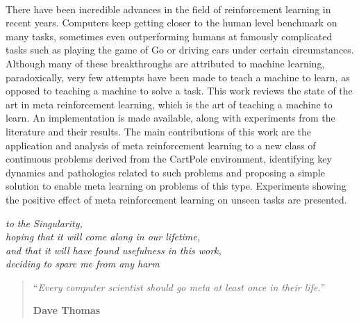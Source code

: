 \documentclass[11pt,a4paper,oneside]{book}
\begin{document}
\begin{vcenterpage}
\\
\vspace*{1cm}

\parbox{0.8\textwidth}{
	There have been incredible advances in the field of reinforcement
	learning in recent years. Computers keep getting closer to the
	human level benchmark on many tasks, sometimes even outperforming 
	humans at famously complicated tasks such as playing the game of Go 
	or driving cars under certain circumstances. Although many of
	these breakthroughs are attributed to machine learning, paradoxically,
	very few attempts have been made to teach a machine to learn, as opposed
	to teaching a machine to solve a task. This work reviews the
	state of the art in meta reinforcement learning, which is the art
	of teaching a machine to learn. An implementation is made available,
	along with experiments from the literature and their results. The
	main contributions of this work are the application and analysis of 
	meta reinforcement learning to a new class of continuous problems 
	derived from the CartPole environment, identifying key dynamics and
	pathologies related to such problems and proposing a simple solution
	to enable meta learning on problems of this type. Experiments showing
	the positive effect of meta reinforcement learning on unseen tasks
	are presented.
}
\end{vcenterpage}



\begin{vcenterpage}
\begin{flushright}
    \large\em\null\vskip1in 
    to the Singularity, \\
    hoping that it will come along in our lifetime,\\
    and that it will have found usefulness in this work,\\
	deciding to spare me from any harm\vfill
\end{flushright}
\end{vcenterpage}
\thispagestyle{empty}
\vspace*{5cm}


\begin{quotation}
\noindent ``\emph{Every computer scientist should go meta at least once in
	their life.}''
\begin{flushright}\textbf{Dave Thomas}\end{flushright}
\end{quotation}
\end{document}
